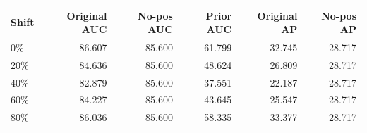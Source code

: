 \begin{tabular}{lrrrrr}\toprule
Shift & Original AUC & No-pos AUC & Prior AUC & Original AP & No-pos AP\\\midrule
0\% & 86.607 & 85.600 & 61.799 & 32.745 & 28.717\\
20\% & 84.636 & 85.600 & 48.624 & 26.809 & 28.717\\
40\% & 82.879 & 85.600 & 37.551 & 22.187 & 28.717\\
60\% & 84.227 & 85.600 & 43.645 & 25.547 & 28.717\\
80\% & 86.036 & 85.600 & 58.335 & 33.377 & 28.717\\
\bottomrule\end{tabular}
